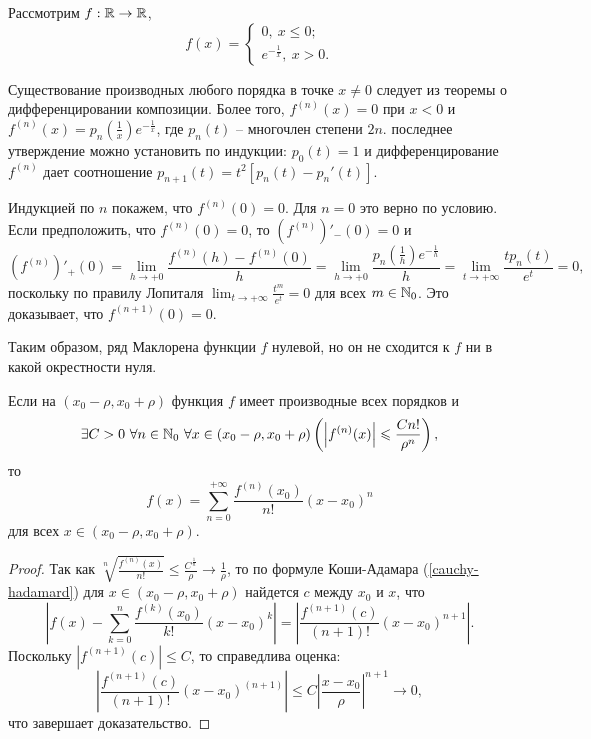 \begin{example}
    Рассмотрим $f: \mathbb{R} \to \mathbb{R}$, 
    \[f(x) = \begin{cases}
        0, \ x \leq 0; \\
        e^{- \frac{1}{x}}, \ x > 0.
    \end{cases}\]
    
    Существование производных любого порядка в точке $x \neq 0$ следует из теоремы о дифференцировании композиции. Более того, $f^{(n)}(x) = 0$ при $x < 0$ и $f^{(n)}(x) = p_{n}(\frac{1}{x})e^{-\frac{1}{x}}$, где $p_{n}(t)$ -- многочлен степени $2n$. последнее утверждение можно установить по индукции: $p_{0}(t) = 1$ и дифференцирование $f^{(n)}$ дает соотношение $p_{n + 1}(t) = t^{2} [p_{n}(t) - p_{n}'(t)]$.

    Индукцией по $n$ покажем, что $f^{(n)}(0) = 0$. Для $n = 0$ это верно по условию. Если предположить, что $f^{(n)}(0) = 0$, то $(f^{(n)})'_{-}(0) = 0$ и
    \[(f^{(n)})'_{+}(0) = \lim_{h \to +0} \frac{f^{(n)}(h) - f^{(n)}(0)}{h} = \lim_{h \to +0}\frac{p_{n}(\frac{1}{h})e^{-\frac{1}{h}}}{h} = \lim_{t \to +\infty} \frac{t p_{n}(t)}{e^{t}} = 0,\]
    поскольку по правилу Лопиталя $\lim_{t \to +\infty} \frac{t^{m}}{e^{t}} = 0$ для всех $m \in \mathbb{N}_{0}$. Это доказывает, что $f^{(n + 1)}(0) = 0$.

    Таким образом, ряд Маклорена функции $f$ нулевой, но он не сходится к $f$ ни в какой окрестности нуля.
\end{example}

\begin{lemma}
    Если на $(x_{0} - \rho, x_{0} + \rho)$ функция $f$ имеет производные всех порядков и 
    \[\exists C > 0 \ \forall n \in \mathbb{N}_{0} \ \forall x \in (x_{0} - \rho, x_{0} + \rho) \left(\left|f^{(n)}(x)\right| \leqslant \frac{C n!}{\rho^{n}}\right),\]
    то 
    \[f(x) = \sum_{n = 0}^{+\infty} \frac{f^{(n)}(x_{0})}{n!}(x - x_{0})^{n}\]
    для всех $x \in (x_{0} - \rho, x_{0} + \rho)$.
\end{lemma}

\begin{proof}
    Так как $\sqrt[n]{\frac{f^{(n)}(x)}{n!}} \leq \frac{C^{\frac{1}{n}}}{\rho} \to \frac{1}{\rho}$, то по формуле Коши-Адамара (\ref{cauchy-hadamard}) для $x \in (x_{0} - \rho, x_{0} + \rho)$ найдется $c$ между $x_{0}$ и $x$, что
    \[\left|f(x) - \sum_{k = 0}^{n}\frac{f^{(k)}(x_{0})}{k!}(x - x_{0})^{k}\right| = \left|\frac{f^{(n + 1)}(c)}{(n + 1)!}(x - x_{0})^{n + 1}\right|.\]
    Поскольку $|f^{(n + 1)}(c)| \leq C$, то справедлива оценка:
    \[\left|\frac{f^{(n + 1)}(c)}{(n + 1)!}(x - x_{0})^{(n + 1)}\right| \leq C\left|\frac{x - x_{0}}{\rho}\right|^{n + 1} \to 0,\]
    что завершает доказательство.
\end{proof}

